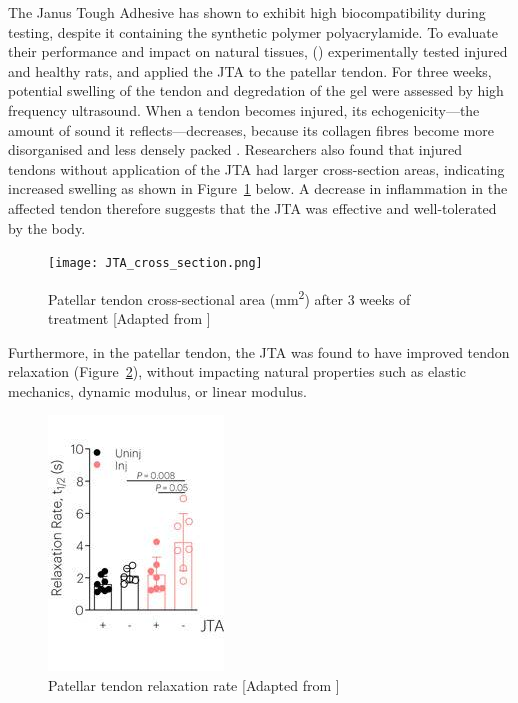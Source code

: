 The Janus Tough Adhesive has shown to exhibit high biocompatibility during testing, despite it containing the synthetic polymer polyacrylamide. To evaluate their performance and impact on natural tissues, \citeauthor{freedmanEnhancedTendonHealing2022} (\citeyear{freedmanEnhancedTendonHealing2022}) experimentally tested  injured and healthy rats, and applied the JTA to the patellar tendon.
For three weeks, potential swelling of the tendon and degredation of the gel were assessed by high frequency ultrasound. When a tendon becomes injured, its echogenicity---the amount of sound it reflects---decreases, because its collagen fibres become more disorganised and less densely packed \autocite{hodgsonTendonLigamentImaging2012}.
Researchers also found that injured tendons without application of the JTA had larger cross-section areas, indicating increased swelling as shown in Figure~\ref{fig:JTA_Patellar_cross_section} below. A decrease in inflammation in the affected tendon therefore suggests that the JTA was effective and well-tolerated by the body.
\begin{figure}[h]
    \centering
    \texttt{[image: JTA\_cross\_section.png]}
    \caption{Patellar tendon cross-sectional area (mm\textsuperscript{2}) after 3 weeks of treatment [Adapted from \cite{freedmanEnhancedTendonHealing2022}]}
    \label{fig:JTA_Patellar_cross_section}
\end{figure}

Furthermore, in the patellar tendon, the JTA was found to have improved tendon relaxation (Figure~\ref{fig:JTA_Patellar_relaxation}), without impacting natural properties such as elastic mechanics, dynamic modulus, or linear modulus.
\begin{figure}[h]
    \centering
    \includegraphics[width=0.6\linewidth]{Figures/JTA_relaxation_patellar.jpeg}
    \caption{Patellar tendon relaxation rate [Adapted from \cite{freedmanEnhancedTendonHealing2022}]}
    \label{fig:JTA_Patellar_relaxation}
\end{figure}

